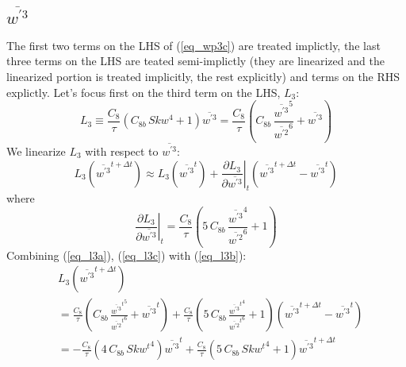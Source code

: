 \documentclass[11pt,fleqn]{article}
\newcommand{\ptlder}[2]{\frac{\partial #1}{\partial #2}}
\begin{document}
\subsection{$\overline{w^{'3}}$}

The first two terms on the LHS of (\ref{eq_wp3c}) are treated implictly,
the last three terms on the LHS are teated semi-implictly (they are linearized
and the linearized portion is treated implicitly, the rest explicitly)
and terms on the RHS explictly. Let's focus first on the third term on the LHS, 
$L_3$:
%
\begin{equation}
\label{eq_l3a}
L_3
\equiv \frac{C_8}{\tau}\left( C_{8b} \, Skw^4 + 1 \right) \overline{w^{'3}}
=   \frac{C_8}{\tau}
    \left(  C_{8b} \, \frac{\overline{w^{'3}}^5}{\overline{w^{'2}}^6}
          + \overline{w^{'3}}
    \right)
\end{equation}
%
We linearize $L_3$ with respect to $\overline{w^{'3}}$:
%
\begin{equation}
\label{eq_l3b}
L_3 \left( \overline{w^{'3}}^{t+\Delta t} \right)
\approx L_3 \left( \overline{w^{'3}}^{t} \right)
+ \left. \ptlder{L_3}{\overline{w^{'3}}} \right|_{t}
  \left( \overline{w^{'3}}^{t+\Delta t} - \overline{w^{'3}}^{t} \right)
\end{equation}
%
where
%
\begin{equation}
\label{eq_l3c}
\left. \ptlder{L_3}{\overline{w^{'3}}} \right|_{t}
=   \frac{C_8}{\tau}
    \left(  5 \, C_{8b} \, \frac{\overline{w^{'3}}^4}{\overline{w^{'2}}^6}
          + 1
    \right)
\end{equation}
%
Combining (\ref{eq_l3a}), (\ref{eq_l3c}) with (\ref{eq_l3b}):
%
\begin{equation}
\label{eq_l3d}
\begin{split}
& L_3 \left( \overline{w^{'3}}^{t+\Delta t} \right) \\
&=   \frac{C_8}{\tau}
      \left(  C_{8b} \, \frac{{\overline{w^{'3}}^t}^5}{{\overline{w^{'2}}^t}^6}
            + \overline{w^{'3}}^t
      \right)
   + \frac{C_8}{\tau}
     \left(  5 \, C_{8b} \, \frac{{\overline{w^{'3}}^t}^4}{{\overline{w^{'2}}^t}^6}
           + 1
     \right)
     \left( \overline{w^{'3}}^{t + \Delta t} - \overline{w^{'3}}^t \right)  \\
&= - \frac{C_8}{\tau}
      \left(  4 \, C_{8b} \, {Skw^t}^4 \right) \overline{w^{'3}}^t
   + \frac{C_8}{\tau}
     \left(  5 \, C_{8b} \, {Skw^t}^4 + 1 \right)
      \overline{w^{'3}}^{t + \Delta t}
\end{split}
\end{equation}
\end{document}
